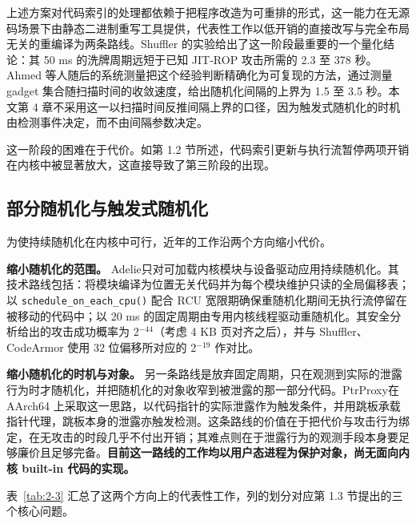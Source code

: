 上述方案对代码索引的处理都依赖于把程序改造为可重排的形式，这一能力在无源码场景下由静态二进制重写工具提供，代表性工作以低开销的直接改写\citep{hawkins2017zipr}与完全布局无关的重编译\citep{williamsking2020egalito}为两条路线。Shuffler 的实验给出了这一阶段最重要的一个量化结论：其 50 ms 的洗牌周期远短于已知 JIT-ROP 攻击所需的 2.3 至 378 秒。Ahmed 等人随后的系统测量\citep{ahmed2020methodologies}把这个经验判断精确化为可复现的方法，通过测量 gadget 集合随扫描时间的收敛速度，给出随机化间隔的上界为 1.5 至 3.5 秒。本文第 4 章不采用这一以扫描时间反推间隔上界的口径，因为触发式随机化的时机由检测事件决定，而不由间隔参数决定。

这一阶段的困难在于代价。如第 1.2 节所述，代码索引更新与执行流暂停两项开销在内核中被显著放大，这直接导致了第三阶段的出现。

\subsection{部分随机化与触发式随机化}

为使持续随机化在内核中可行，近年的工作沿两个方向缩小代价。

\textbf{缩小随机化的范围。} Adelie\citep{nikolaev2022adelie,nadeem2020kernelmodule}只对可加载内核模块与设备驱动应用持续随机化。其技术路线包括：将模块编译为位置无关代码并为每个模块维护只读的全局偏移表；以 \lstinline[breaklines=false]@schedule_on_each_cpu()@ 配合 RCU 宽限期确保重随机化期间无执行流停留在被移动的代码中；以 20 ms 的固定周期由专用内核线程驱动重随机化。其安全分析给出的攻击成功概率为 2$^{-44}$（考虑 4 KB 页对齐之后），并与 Shuffler、CodeArmor 使用 32 位偏移所对应的 2$^{-19}$ 作对比。

\textbf{缩小随机化的时机与对象。} 另一条路线是放弃固定周期，只在观测到实际的泄露行为时才随机化，并把随机化的对象收窄到被泄露的那一部分代码。PtrProxy\citep{luo2025ptrproxy}在 AArch64 上采取这一思路，以代码指针的实际泄露作为触发条件，并用跳板承载指针代理，跳板本身的泄露亦触发检测。这条路线的价值在于把代价与攻击行为绑定，在无攻击的时段几乎不付出开销；其难点则在于泄露行为的观测手段本身要足够廉价且足够完备。\textbf{目前这一路线的工作均以用户态进程为保护对象，尚无面向内核 built-in 代码的实现。}

表~\ref{tab:2-3} 汇总了这两个方向上的代表性工作，列的划分对应第 1.3 节提出的三个核心问题。

